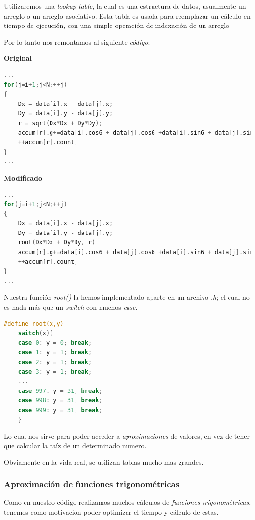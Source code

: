 Utilizaremos una \emph{lookup table}, la cual es una estructura de datos, usualmente un arreglo o un arreglo asociativo.
Esta tabla es usada para reemplazar un cálculo en tiempo de ejecución,
con una simple operación de indexación de un arreglo.

Por lo tanto nos remontamos al siguiente \emph{código}:

\textbf{Original}
\begin{center}
\begin{lstlisting}[language=C]
...
for(j=i+1;j<N;++j)
{
	Dx = data[i].x - data[j].x;
	Dy = data[i].y - data[j].y;
	r = sqrt(Dx*Dx + Dy*Dy);
	accum[r].g+=data[i].cos6 + data[j].cos6 +data[i].sin6 + data[j].sin6;
	++accum[r].count;
}
...
\end{lstlisting}
\end{center}
\textbf{Modificado}
\begin{center}
\begin{lstlisting}[language=C]
...
for(j=i+1;j<N;++j)
{
	Dx = data[i].x - data[j].x;
	Dy = data[i].y - data[j].y;
	root(Dx*Dx + Dy*Dy, r)
	accum[r].g+=data[i].cos6 + data[j].cos6 +data[i].sin6 + data[j].sin6;
	++accum[r].count;
}
...
\end{lstlisting}
\end{center}

Nuestra función \emph{root()} la hemos implementado aparte en un archivo \emph{.h};
el cual no es nada más que un \emph{switch} con muchos \emph{case}.

\begin{center}
\begin{lstlisting}[language=C]
#define root(x,y)
	switch(x){
	case 0: y = 0; break;
	case 1: y = 1; break;
	case 2: y = 1; break;
	case 3: y = 1; break;
	...
	case 997: y = 31; break;
	case 998: y = 31; break;
	case 999: y = 31; break;
	}
\end{lstlisting}
\end{center}

Lo cual nos sirve para poder acceder a \emph{aproximaciones} de valores,
en vez de tener que calcular la raíz de un determinado numero.

Obviamente en la vida real,
se utilizan tablas mucho mas grandes.


\subsubsection{Aproximación de funciones trigonométricas}
Como en nuestro código realizamos muchos cálculos de \emph{funciones trigonométricas},
tenemos como motivación poder optimizar el tiempo y cálculo de éstas.

